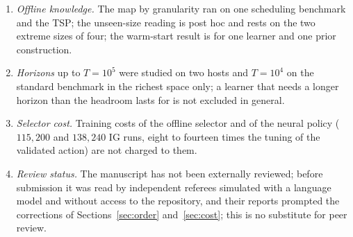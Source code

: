 \begin{enumerate}[label=(\roman*)]
\item \emph{Offline knowledge.} The map by granularity ran on one scheduling benchmark and the TSP; the unseen-size reading is post hoc and rests on the two extreme sizes of four; the warm-start result is for one learner and one prior construction.
\item \emph{Horizons} up to $T=10^5$ were studied on two hosts and $T=10^4$ on the standard benchmark in the richest space only; a learner that needs a longer horizon than the headroom lasts for is not excluded in general.
\item \emph{Selector cost.} Training costs of the offline selector and of the neural policy ($115{,}200$ and $138{,}240$ IG runs, eight to fourteen times the tuning of the validated action) are not charged to them.
\item \emph{Review status.} The manuscript has not been externally reviewed; before submission it was read by independent referees simulated with a language model and without access to the repository, and their reports prompted the corrections of Sections~\ref{sec:order} and~\ref{sec:cost}; this is no substitute for peer review.
\end{enumerate}

